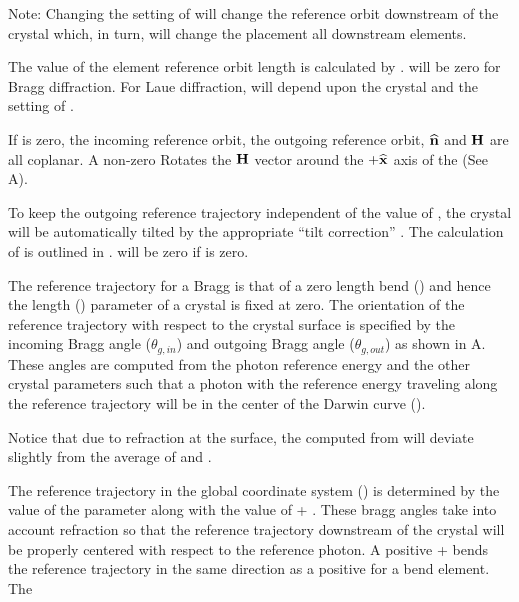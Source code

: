 Note: Changing the setting of  will change the
reference orbit downstream of the crystal which, in turn, will change
the placement all downstream elements.

The value of the element reference orbit length  is calculated
by \bmad.  will be zero for Bragg diffraction. For Laue
diffraction,  will depend upon the crystal  and
the setting of .

If  is zero, the incoming reference orbit, the outgoing
reference orbit, ${\widehat{\bf n}}$ and ${\bf H}$ are all coplanar. A non-zero
 Rotates the ${\bf H}$ vector around the $+{\widehat{\bf x}}$ axis
of the  (See A).

To keep the outgoing reference trajectory independent of the value of
, the crystal will be automatically tilted by the
appropriate ``tilt correction'' . The calculation of
 is outlined in . 
will be zero if  is zero.

The reference trajectory for a Bragg  is that of a zero
length bend () and hence the length ()
parameter of a crystal is fixed at zero. The orientation of the
reference trajectory with respect to the crystal surface is specified
by the incoming Bragg angle  ($\theta_{g,in}$) and
outgoing Bragg angle  ($\theta_{g,out}$) as shown
in A. These angles are computed from the photon
reference energy and the other crystal parameters such that a photon
with the reference energy traveling along the reference trajectory
will be in the center of the Darwin curve ().

Notice that due to refraction at the surface, the computed
 from  will deviate slightly from the
average of  and .

The reference trajectory in the global coordinate system
() is determined by the value of the 
parameter along with the value of  +
. These bragg angles take into account refraction
so that the reference trajectory downstream of the crystal will be
properly centered with respect to the reference photon. A positive
 +  bends the reference
trajectory in the same direction as a positive  for a bend
element. The


